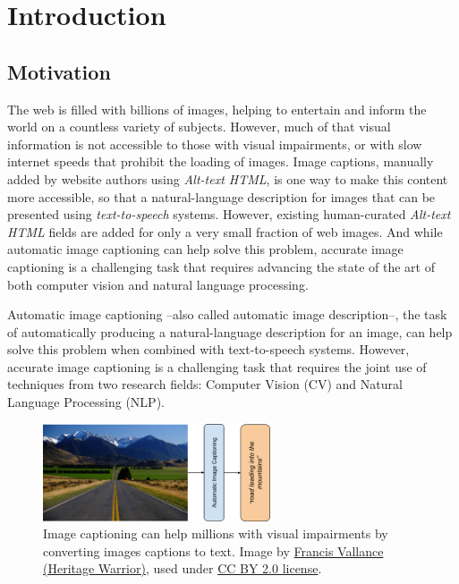 \chapter{Introduction}
\label{chapter:introduccion}

\section{Motivation}

The web is filled with billions of images, helping to entertain and inform the world on a countless variety of subjects. However, much of that visual information is not accessible to those with visual impairments, or with slow internet speeds that prohibit the loading of images. Image captions, manually added by website authors using\textit{ Alt-text HTML}, is one way to make this content more accessible, so that a natural-language description for images that can be presented using \textit{text-to-speech} systems. However, existing human-curated \textit{Alt-text HTML} fields are added for only a very small fraction of web images. 
And while automatic image captioning can help solve this problem, accurate image captioning is a challenging task that requires advancing the state of the art of both computer vision and natural language processing.

Automatic image captioning --also called automatic image description--, the task of automatically producing a natural-language description for an image, can help solve this problem when combined with text-to-speech systems.  However, accurate image captioning is a challenging task that requires the joint use of techniques from two research fields: Computer Vision (CV) and Natural Language Processing (NLP).

\begin{figure}
	\centering
	\includegraphics[width=0.6\textwidth]{figs/ch1/image-captioning.png}
	\caption{Image captioning can help millions with visual impairments by converting images captions to text. Image by \href{https://www.flickr.com/photos/francisvallance/}{Francis Vallance (Heritage Warrior)}, used under \href{https://creativecommons.org/licenses/by/2.0/}{CC BY 2.0 license}.}
	\label{fig:image-captioning}
\end{figure}

